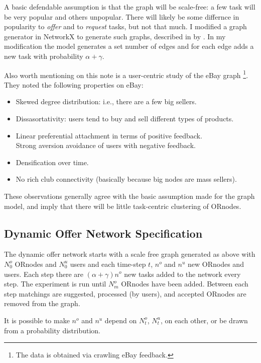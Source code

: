 \documentclass[main.tex]{subfiles}
\begin{document}
A basic defendable assumption is that the graph will be scale-free: a few task will be very popular and others unpopular. There will likely be some differnce in popularity to \textit{offer} and to \textit{request} tasks, but not that much. I modified a graph generator in NetworkX \cite{netX} to generate such graphs, described in by \cite{Bol}. In my modification the model generates a set number of edges and for each edge adds a new task with probability $\alpha + \gamma$.

Also worth mentioning on this note is a user-centric study of the eBay graph \cite{ebay}\footnote{The data is obtained via crawling eBay feedback.}. They noted the following properties on eBay:

\begin{itemize}
  \item Skewed degree distribution: i.e., there are a few big sellers.
  \item Dissasortativity: users tend to buy and sell different types of products.
  \item Linear preferential attachment in terms of positive feedback.
     \\ Strong aversion avoidance of users with negative feedback.
  \item Densification over time.
  \item No rich club connectivity (basically because big nodes are mass sellers).
\end{itemize}

These observations generally agree with the basic assumption made for the graph model, and imply that there will be little task-centric clustering of ORnodes.


\subsection{Dynamic Offer Network Specification}
The dynamic offer network starts with a scale free graph generated as above with $N^o_0$ ORnodes and $N^u_0$ users and each time-step $t$, $n^o$ and $n^u$ new ORnodes and users. Each step there are $(\alpha + \gamma) n^o$ new tasks added to the network every step. The experiment is run until $N^o_m$ ORnodes have been added. Between each step matchings are suggested, processed (by users), and accepted ORnodes are removed from the graph.

It is possible to make $n^o$ and $n^u$ depend on $N^o_t$, $N^u_t$, on each other, or be drawn from a probability distribution.
\end{document}
